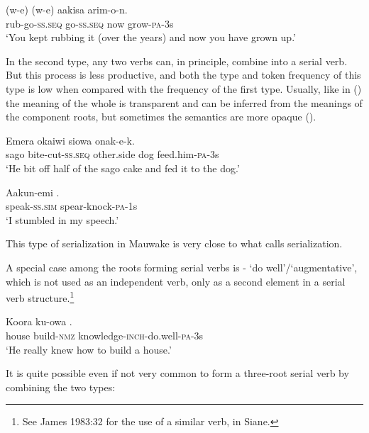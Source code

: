 \ea%
\label{ex:x439}
\gll {}(w-e) (w-e) aakisa arim-o-n. \\
rub-go-\textsc{ss}.\textsc{seq} go-\textsc{ss}.\textsc{seq} now grow-\textsc{pa}-3s\\
\glt`You kept rubbing it (over the years) and now you have grown up.'
\z

In the second type, any two verbs can, in principle, combine into a serial verb. But this process is less productive, and both the type and token frequency of this type is low when compared with the frequency of the first type. Usually, like in () the meaning of the whole is transparent and can be inferred from the meanings of the component roots, but sometimes the semantics are more opaque ().

\ea%
\label{ex:x382}
\gll Emera  okaiwi siowa onak-e-k. \\
sago bite-cut-\textsc{ss}.\textsc{seq} other.side dog feed.him-\textsc{pa}-3s \\
\glt`He bit off half of the sago cake and fed it to the dog.'
\z

\ea%
\label{ex:x383}
\gll Aakun-emi . \\
speak-\textsc{ss}.\textsc{sim} spear-knock-\textsc{pa}-1s \\
\glt`I stumbled in my speech.'
\z

This type of serialization in Mauwake is very close to what \citet[1--5]{James1983} calls  serialization. 

A special case among the roots forming serial verbs is - `do well'/`augmentative', which is not used as an independent verb, only as a second element in a serial verb structure.\footnote{See James 1983:32 for the use of a similar verb,  in Siane.}

\ea%
\label{ex:x384}
\gll Koora ku-owa . \\
house build-\textsc{nmz} knowledge-\textsc{inch}-do.well-\textsc{pa}-3s \\
\glt`He really knew how to build a house.'
\z

It is quite possible even if not very common to form a three-root serial verb by combining the two types:

